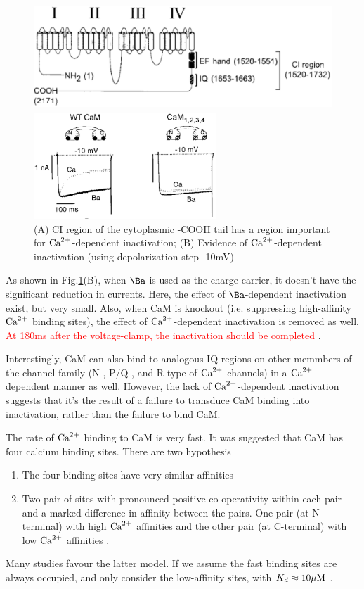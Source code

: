 \begin{figure}[hbt]
  \centerline{\includegraphics[height=4cm,
    angle=0]{./images/LCC_diagram.eps} }
  \centerline{\includegraphics[height=4cm,
    angle=0]{./images/LCC_Ca-dependent_inactivation.eps} }
\caption{ (A) CI region of the cytoplasmic -COOH tail has a region important for
${\text{Ca}^{2+}}$-dependent inactivation; (B) Evidence of ${\text{Ca}^{2+}}$-dependent inactivation
(using depolarization step -10mV)}
\label{fig:LCC_diagram}
\end{figure}

As shown in Fig.\ref{fig:LCC_diagram}(B), when $\Ba$ is used as the charge
carrier, it doesn't have the significant reduction in currents. Here, the effect
of $\Ba$-dependent inactivation exist, but very small. Also, when CaM is
knockout (i.e. suppressing high-affinity ${\text{Ca}^{2+}}$ binding sites), the effect of
${\text{Ca}^{2+}}$-dependent inactivation is removed as well. \textcolor{red}{At 180ms after
the voltage-clamp, the inactivation should be completed} \citep{rose1992}. 

\begin{framed}
Interestingly, CaM can also bind to analogous IQ regions on other memmbers of
the channel family (N-, P/Q-, and R-type of ${\text{Ca}^{2+}}$ channels) in a ${\text{Ca}^{2+}}$-dependent
manner as well. However, the lack of ${\text{Ca}^{2+}}$-dependent inactivation suggests that
it's the result of a failure to transduce CaM binding into inactivation, rather
than the failure to bind CaM.

\end{framed}

The rate of ${\text{Ca}^{2+}}$ binding to CaM is very fast. It was suggested that CaM has
four calcium binding sites. There are two hypothesis \citep{cox1988}
\begin{enumerate}
  \item The four binding sites have very similar affinities
  \item Two pair of sites with pronounced positive co-operativity within each
  pair and a marked difference in affinity between the pairs. One pair (at
  N-terminal) with high ${\text{Ca}^{2+}}$ affinities  and the other pair (at C-terminal)
  with low ${\text{Ca}^{2+}}$ affinities \citep{martin1985}. 
\end{enumerate}
Many studies favour the latter model. If we assume the fast binding sites are
always occupied, and only consider the low-affinity sites, with $K_d \approx
10{\mu\text{M}}$ \citep{jurado1999}.

